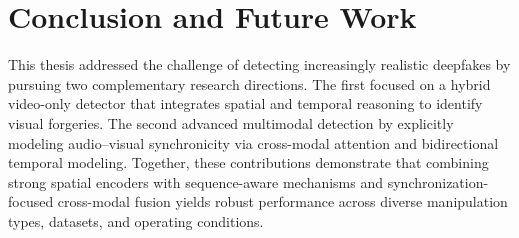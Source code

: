 \chapter{Conclusion and Future Work}
\label{ch:conclusion-future}

This thesis addressed the challenge of detecting increasingly realistic deepfakes by pursuing two complementary research directions. The first focused on a hybrid video-only detector that integrates spatial and temporal reasoning to identify visual forgeries. The second advanced multimodal detection by explicitly modeling audio--visual synchronicity via cross-modal attention and bidirectional temporal modeling. Together, these contributions demonstrate that combining strong spatial encoders with sequence-aware mechanisms and synchronization-focused cross-modal fusion yields robust performance across diverse manipulation types, datasets, and operating conditions.

